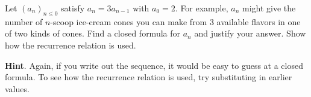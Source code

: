 \documentclass{book}
\begin{document}
\setcounter{cpjt}{144}
\addtocounter{cpjt}{-1}
\begin{activity}\label{act-geometric}
\hypertarget{p-924}{}%
Let \((a_n)_{n \le 0}\) satisfy \(a_n = 3a_{n-1}\) with \(a_0 = 2\).  For example, \(a_n\) might give the number of \(n\)-scoop ice-cream cones you can make from 3 available flavors in one of two kinds of cones.  Find a closed formula for \(a_n\) and justify your answer.  Show how the recurrence relation is used.%
\par\smallskip%
\noindent\textbf{Hint}.\hypertarget{hint-103}{}\quad%
\hypertarget{p-925}{}%
Again, if you write out the sequence, it would be easy to guess at a closed formula.  To see how the recurrence relation is used, try substituting in earlier values.%
\end{activity}

\clearpage
\end{document}
